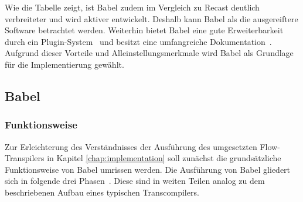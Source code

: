 Wie die Tabelle zeigt, ist Babel zudem im Vergleich zu Recast deutlich verbreiteter und wird aktiver entwickelt. Deshalb kann Babel als die ausgereiftere Software betrachtet werden. Weiterhin bietet Babel eine gute Erweiterbarkeit durch ein Plugin-System~\autocite{BABEL:HANDBOOK} und besitzt eine umfangreiche Dokumentation~\autocite{BABEL:DOCS}. Aufgrund dieser Vorteile und Alleinstellungsmerkmale wird Babel als Grundlage für die Implementierung gewählt.

\subsection{Babel}
\label{sec:babel}

\subsubsection{Funktionsweise}

Zur Erleichterung des Verständnisses der Ausführung des umgesetzten Flow-Transpilers in Kapitel \ref{chap:implementation} soll zunächst die grundsätzliche Funktionsweise von Babel umrissen werden. Die Ausführung von Babel gliedert sich in folgende drei Phasen~\autocite{BABEL:HANDBOOK}. Diese sind in weiten Teilen analog zu dem beschriebenen Aufbau eines typischen Transcompilers.


